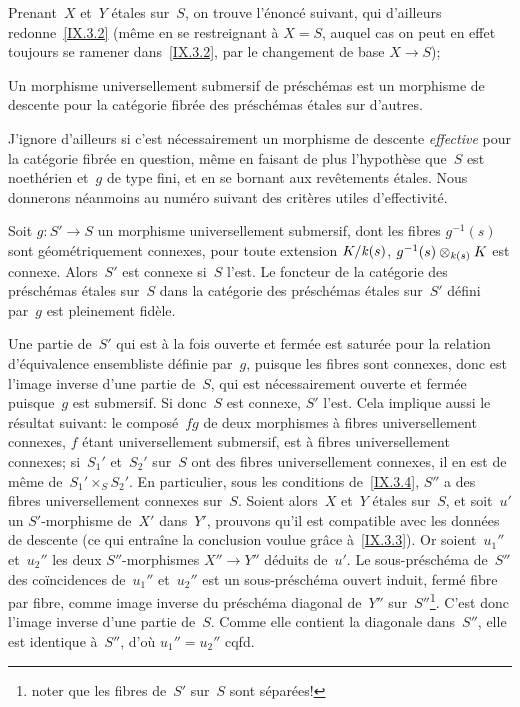 Prenant~$X$ et~$Y$ \'etales sur~$S$, on trouve l'\'enonc\'e
suivant, qui d'ailleurs redonne~\ref{IX.3.2} (m\^eme en se
restreignant \`a $X=S$, auquel cas on peut en effet toujours se
ramener dans~\ref{IX.3.2}, par le changement de base $X\to S$);

\begin{corollaire}
\label{IX.3.3}
Un morphisme universellement submersif de pr\'esch\'emas est un
morphisme de descente pour la cat\'egorie fibr\'ee des
pr\'esch\'emas \'etales sur d'autres.
\end{corollaire}

J'ignore d'ailleurs si c'est n\'ecessairement un morphisme de
descente \emph{effective} pour la cat\'egorie fibr\'ee en
question, m\^eme en faisant de plus l'hypoth\`ese que~$S$ est
noeth\'erien et~$g$ de type fini, et en se bornant aux
rev\^etements \'etales. Nous donnerons n\'eanmoins au
num\'ero suivant des crit\`eres utiles d'effectivit\'e.

\begin{corollaire}
\label{IX.3.4}
Soit
$g\colon S'\to S$ un morphisme universellement submersif, dont
les fibres $g^{-1}(s)$ sont \og g\'eom\'etriquement connexes\fg,
\ie pour toute extension $K/\mathit{k}(s)$, $g^{-1}(s)\otimes_{\mathit{k}(s)} K$ est
connexe. Alors~$S'$ est connexe si~$S$ l'est. Le foncteur de la
cat\'egorie des pr\'esch\'emas \'etales sur~$S$ dans la
cat\'egorie
des pr\'esch\'emas \'etales sur~$S'$ d\'efini par~$g$ est
pleinement fid\`ele.
\end{corollaire}

Une partie de~$S'$ qui est \`a la fois ouverte et ferm\'ee est
satur\'ee pour la relation d'\'equivalence ensembliste d\'efinie
par~$g$, puisque les fibres sont connexes, donc est l'image inverse
d'une partie de~$S$, qui est n\'ecessairement ouverte et ferm\'ee
puisque~$g$ est submersif. Si donc~$S$ est connexe, $S'$ l'est. Cela
implique aussi le r\'esultat suivant: le compos\'e~$fg$ de deux
morphismes \`a fibres universellement connexes,
$f$ \'etant universellement submersif, est \`a fibres
universellement connexes; si~$S_1'$ et~$S_2'$ sur~$S$ ont des fibres
universellement connexes, il en est de m\^eme de~$S_1'\times_S
S_2'$. En particulier, sous les conditions de~\ref{IX.3.4}, $S''$ a
des fibres universellement connexes sur~$S$. Soient alors~$X$ et~$Y$
\'etales sur~$S$, et soit~$u'$ un $S'$-morphisme de~$X'$ dans~$Y'$,
prouvons qu'il est compatible avec les donn\'ees de descente (ce qui
entra\^ine la conclusion voulue gr\^ace \`a~\ref{IX.3.3}). Or
soient~$u_1''$ et~$u_2''$ les deux $S''$-morphismes $X''\to Y''$
d\'eduits de~$u'$. Le sous-pr\'esch\'ema de~$S''$ des
co\"incidences de~$u_1''$ et~$u_2''$ est un sous-pr\'esch\'ema
ouvert induit, ferm\'e fibre par fibre, comme image inverse du
pr\'esch\'ema diagonal de~$Y''$ sur~$S''$\footnote{noter que les
fibres de~$S'$ sur~$S$ sont s\'epar\'ees!}. C'est donc l'image
inverse d'une partie de~$S$. Comme elle contient la diagonale
dans~$S''$, elle est identique \`a~$S''$, d'o\`u $u_1''=u_2''$
cqfd.

